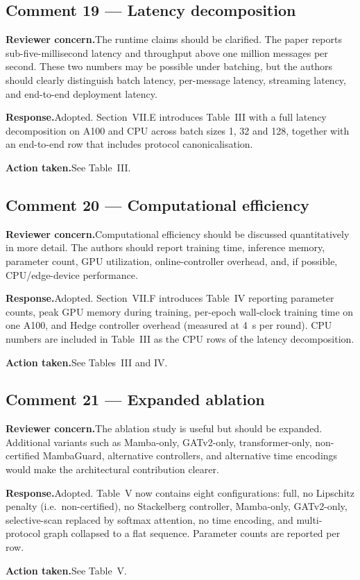 \documentclass[11pt,a4paper]{article}
\newcommand{\concern}[1]{\noindent\textbf{Reviewer concern.}\quad #1\par\vspace{0.3em}}
\newcommand{\response}[1]{\noindent\textbf{Response.}\quad #1\par\vspace{0.3em}}
\newcommand{\action}[1]{\noindent\textbf{Action taken.}\quad #1\par\vspace{0.8em}}
\begin{document}
\subsection*{Comment 19 --- Latency decomposition}
\concern{The runtime claims should be clarified. The paper reports sub-five-millisecond latency and throughput above one million messages per second. These two numbers may be possible under batching, but the authors should clearly distinguish batch latency, per-message latency, streaming latency, and end-to-end deployment latency.}
\response{Adopted. Section~VII.E introduces Table~III with a full latency decomposition on A100 and CPU across batch sizes 1, 32 and 128, together with an end-to-end row that includes protocol canonicalisation.}
\action{See Table~III.}

\subsection*{Comment 20 --- Computational efficiency}
\concern{Computational efficiency should be discussed quantitatively in more detail. The authors should report training time, inference memory, parameter count, GPU utilization, online-controller overhead, and, if possible, CPU/edge-device performance.}
\response{Adopted. Section~VII.F introduces Table~IV reporting parameter counts, peak GPU memory during training, per-epoch wall-clock training time on one A100, and Hedge controller overhead (measured at 4~\textmu s per round). CPU numbers are included in Table~III as the CPU rows of the latency decomposition.}
\action{See Tables~III and IV.}

\subsection*{Comment 21 --- Expanded ablation}
\concern{The ablation study is useful but should be expanded. Additional variants such as Mamba-only, GATv2-only, transformer-only, non-certified MambaGuard, alternative controllers, and alternative time encodings would make the architectural contribution clearer.}
\response{Adopted. Table~V now contains eight configurations: full, no Lipschitz penalty (i.e.\ non-certified), no Stackelberg controller, Mamba-only, GATv2-only, selective-scan replaced by softmax attention, no time encoding, and multi-protocol graph collapsed to a flat sequence. Parameter counts are reported per row.}
\action{See Table~V.}
\end{document}
